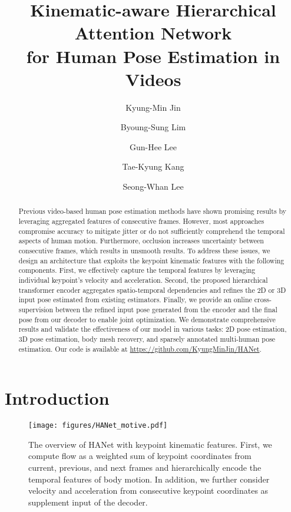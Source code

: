 \documentclass[10pt,twocolumn,letterpaper]{article}
\begin{document}
\title{Kinematic-aware Hierarchical Attention Network\\ for Human Pose Estimation in Videos}

\author[1]{Kyung-Min Jin}
\author[1]{Byoung-Sung Lim}
\author[2]{Gun-Hee Lee}
\author[1]{Tae-Kyung Kang}
\author[1]{Seong-Whan Lee}

\maketitle
\thispagestyle{empty}

\begin{abstract}
     Previous video-based human pose estimation methods have shown promising results by leveraging aggregated features of consecutive frames. However, most approaches compromise accuracy to mitigate jitter or do not sufficiently comprehend the temporal aspects of human motion. Furthermore, occlusion increases uncertainty between consecutive frames, which results in unsmooth results. To address these issues, we design an architecture that exploits the keypoint kinematic features with the following components. First, we effectively capture the temporal features by leveraging individual keypoint's velocity and acceleration. Second, the proposed hierarchical transformer encoder aggregates spatio-temporal dependencies and refines the 2D or 3D input pose estimated from existing estimators. Finally, we provide an online cross-supervision between the refined input pose generated from the encoder and the final pose from our decoder to enable joint optimization. We demonstrate comprehensive results and validate the effectiveness of our model in various tasks: 2D pose estimation, 3D pose estimation, body mesh recovery, and sparsely annotated multi-human pose estimation. Our code is available at \url{https://github.com/KyungMinJin/HANet}.
\end{abstract}
\section{Introduction}

\begin{figure}[t]
\centering
\texttt{[image: figures/HANet\_motive.pdf]}
\caption{The overview of HANet with keypoint kinematic features. First, we compute flow as a weighted sum of keypoint coordinates from current, previous, and next frames and hierarchically encode the temporal features of body motion. In addition, we further consider velocity  and acceleration  from consecutive keypoint coordinates as supplement input of the decoder.}
\label{fig:keypoint motion}
\end{figure}
\end{document}
